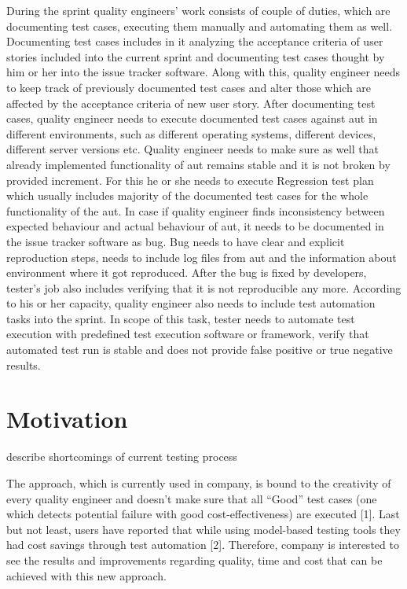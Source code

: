 During the sprint quality engineers' work consists of couple of duties, which are documenting test cases, executing them manually and automating them as well. 
Documenting test cases includes in it analyzing the acceptance criteria of user stories included into the current sprint and documenting test cases thought by him or her into the issue tracker software. Along with this, quality engineer needs to keep track of previously documented test cases and alter those which are affected by the acceptance criteria of new user story.
After documenting test cases, quality engineer needs to execute documented test cases against \acrlong{aut} in different environments, such as different operating systems, different devices, different server versions etc. Quality engineer needs to make sure as well that already implemented functionality of \acrlong{aut} remains stable and it is not broken by provided increment. For this he or she needs to execute Regression test plan which usually includes majority of the documented test cases for the whole functionality of the \acrshort{aut}. In case if quality engineer finds inconsistency between expected behaviour and actual behaviour of \acrshort{aut}, it needs to be documented in the issue tracker software as bug. Bug needs to have clear and explicit reproduction steps, needs to include log files from \acrlong{aut} and the information about environment where it got reproduced. After the bug is fixed by developers, tester's job also includes verifying that it is not reproducible any more.
According to his or her capacity, quality engineer also needs to include test automation tasks into the sprint. In scope of this task, tester needs to automate test execution with predefined test execution software or framework, verify that automated test run is stable and does not provide false positive or true negative results.

\section{Motivation}


describe shortcomings of current testing process

The approach, which is currently used in company, is bound to the creativity of every quality engineer and doesn’t make sure that all “Good” test cases (one which detects potential failure with good cost-effectiveness) are executed [1]. Last but not least, users have reported that while using model-based testing tools they had cost savings through test automation [2]. Therefore, company is interested to see the results and improvements regarding quality, time and cost that can be achieved with this new approach.


